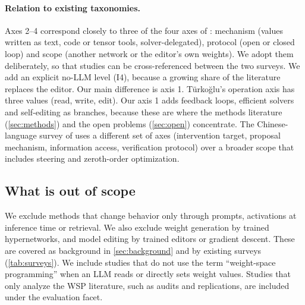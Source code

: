 \paragraph{Relation to existing taxonomies.} Axes 2--4 correspond closely to three of the four axes of \citet{turkoglu2026survey}: mechanism (values written as text, code or tensor tools, solver-delegated), protocol (open or closed loop) and scope (another network or the editor's own weights). We adopt them deliberately, so that studies can be cross-referenced between the two surveys. We add an explicit no-LLM level (I4), because a growing share of the literature replaces the editor. Our main difference is axis 1. Türkoğlu's operation axis has three values (read, write, edit). Our axis 1 adds feedback loops, efficient solvers and self-editing as branches, because these are where the methods literature (\cref{sec:methods}) and the open problems (\cref{sec:open}) concentrate. The Chinese-language survey of \citet{emecii2026survey} uses a different set of axes (intervention target, proposal mechanism, information access, verification protocol) over a broader scope that includes steering and zeroth-order optimization.



\subsection{What is out of scope}
We exclude methods that change behavior only through prompts, activations at inference time or retrieval. We also exclude weight generation by trained hypernetworks, and model editing by trained editors or gradient descent. These are covered as background in \cref{sec:background} and by existing surveys (\cref{tab:surveys}). We include studies that do not use the term ``weight-space programming'' when an LLM reads or directly sets weight values. Studies that only analyze the WSP literature, such as audits and replications, are included under the evaluation facet.
